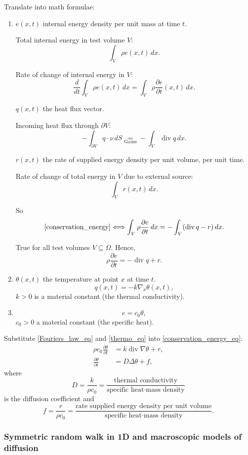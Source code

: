 \documentclass[12pt]{article}
\DeclareMathOperator{\diver}{div}
\theoremstyle{definition}
\begin{document}
Translate into math formulae:
\begin{enumerate}[label=(\arabic*)]
\item\label{conservation_energy_eq} $e(x,t)$ internal energy density per unit mass at time $t$.

Total internal energy in test volume $V$:
\[\int_V\rho e(x,t)\,dx.\]

Rate of change of internal energy in $V$:
\[\frac{d}{dt}\int_V\rho e(x,t)\,dx=\int_V\rho\frac{\partial e}{\partial t}(x,t)\,dx.\]

$q(x,t)$ the heat flux vector.

Incoming heat flux through $\partial V$:
\[-\int_{\partial V}q\cdot\nu\,dS\underset{\text{Gauss}}{=}-\int_V\diver q\,dx.\]

$r(x,t)$ the rate of supplied energy density per unit volume, per unit time.

Rate of change of total energy in $V$ due to external source:
\[\int_Vr(x,t)\,dx.\]

So
\[\text{\ref{conservation_energy}}\Longleftrightarrow\int_V\rho\frac{\partial e}{\partial t}\,dx=-\int_V(\diver q-r)\,dx.\]

True for all test volumes $V\subseteq\Omega$. Hence,
\[\rho\frac{\partial e}{\partial t}=-\diver q+r.\]

\item\label{Fouriers_law_eq} $\theta(x,t)$ the temperature at point $x$ at time $t$.
\[q(x,t)=-k\nabla_x\theta(x,t),\]
$k>0$ is a material constant (the thermal conductivity).

\item\label{thermo_eq} \[e=c_0\theta,\]
$c_0>0$ a material constant (the specific heat).
\end{enumerate}

Substitute \ref{Fouriers_law_eq} and \ref{thermo_eq} into \ref{conservation_energy_eq}:
\begin{align*}
\rho c_0\frac{\partial\theta}{\partial t}&=k\diver\nabla\theta+r,\\
\frac{\partial\theta}{\partial t}&=D\Delta\theta+f,
\end{align*}
where
\[D=\frac{k}{\rho c_0}=\frac{\text{thermal conductivity}}{\text{specific heat}\cdot\text{mass density}}\]
is the diffusion coefficient and
\[f=\frac{r}{\rho c_0}=\frac{\text{rate supplied energy density per unit volume}}{\text{specific heat}\cdot\text{mass density}}.\]

\subsubsection*{Symmetric random walk in 1D and macroscopic models of diffusion}
\end{document}
